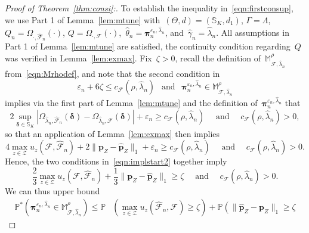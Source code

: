 \documentclass[11pt, a4paper]{article}
\theoremstyle{definition}
\begin{document}
\begin{proof}[Proof of Theorem~\ref{thm:consi}:]
To establish the inequality in~\eqref{eqn:firstconsup}, we use Part 1 of Lemma~\ref{lem:mtune} with~$(\Theta, d) = (\mathbb{S}_K, d_1)$, $\Gamma = \Lambda$, $Q_n = \Omega_{\cdot, \hat{\mathcal{F}}_n}(\cdot)$, $Q = \Omega_{\cdot, \mathcal{F}}(\cdot)$,~$\hat{\theta}_n = \bm{\pi}_n^{\varepsilon_n, \hat{\lambda}_n}$, and~$\hat{\gamma}_n = \hat{\lambda}_n$. All assumptions in Part 1 of Lemma~\ref{lem:mtune} are satisfied, the continuity condition regarding~$Q$ was verified in Lemma~\ref{lem:exmax}. Fix~$\zeta > 0$, recall the definition of~$\mathbb{M}_{\mathcal{F},  \hat{\lambda}_n}^{\rho}$ from~\eqref{eqn:Mrhodef}, and note that the second condition in
%
\begin{equation}\label{eqn:implstart2}
\varepsilon_n + 6 \zeta \leq c_{\mathcal{F}}(\rho, \hat{\lambda}_{n}) ~~ \text{ and } ~~ \bm{\pi}_n^{\varepsilon_n, \hat{\lambda}_n} \in \mathbb{M}_{\mathcal{F},  \hat{\lambda}_n}^{\rho}
\end{equation}
%
implies via the first part of Lemma~\ref{lem:mtune} and the definition of~$\bm{\pi}_n^{\varepsilon_n, \hat{\lambda}_n}$ that
%
\begin{equation*}
2 \sup_{\bm{\delta} \in \mathbb{S}_K} |\Omega_{\hat{\lambda}_n, \hat{\mathcal{F}}_n}(\bm{\delta}) - \Omega_{\hat{\lambda}_n, \mathcal{F}}(\bm{\delta})| + \varepsilon_n \geq c_{\mathcal{F}}(\rho, \hat{\lambda}_n) \quad \text{ and } \quad c_{\mathcal{F}}(\rho, \hat{\lambda}_n) > 0,
\end{equation*}
%
so that an application of Lemma~\ref{lem:exmax} then implies
%
\begin{equation*}
4 \max_{z \in \mathcal{Z}}u_z(\mathcal{F}, \hat{\mathcal{F}}_n) + 2 \|\bm{p}_Z - \hat{\bm{p}}_Z\|_1 +  \varepsilon_n \geq c_{\mathcal{F}}(\rho, \hat{\lambda}_n) \quad \text{ and } \quad c_{\mathcal{F}}(\rho, \hat{\lambda}_n) > 0.
\end{equation*}
%
Hence, the two conditions in~\eqref{eqn:implstart2} together imply~$$\frac{2}{3} \max_{z \in \mathcal{Z}}u_z(\mathcal{F}, \hat{\mathcal{F}}_n) + \frac{1}{3}\|\bm{p}_Z - \hat{\bm{p}}_Z\|_1 \geq \zeta \quad  \text{ and } \quad c_{\mathcal{F}}(\rho, \hat{\lambda}_n) > 0.$$ We can thus upper bound
%
\begin{equation}
\begin{aligned}\label{eqn:upconssplit}
\mathbb{P}^* \left( \bm{\pi}_{n}^{\varepsilon_n, \hat{\lambda}_{n}}  \in \mathbb{M}_{\mathcal{F},  \hat{\lambda}_{n}}^{\rho}\right) \leq \mathbb{P} &\left(
\max_{z \in \mathcal{Z}} u_z(\hat{\mathcal{F}}_{n}, \mathcal{F})  \geq \zeta
\right) + \mathbb{P} \left(\|\hat{\bm{p}}_Z - \bm{p}_Z \|_1 \geq \zeta

\end{aligned}
\end{equation}
\end{proof}
\end{document}
